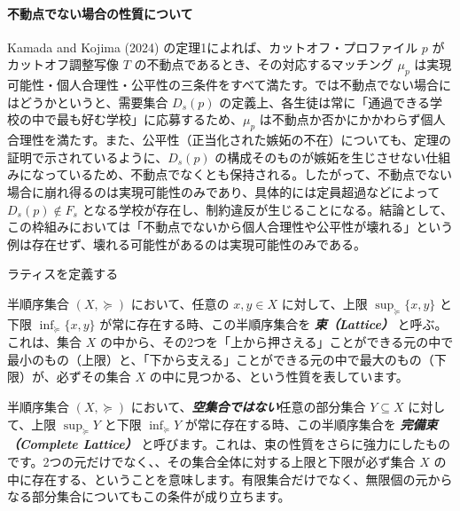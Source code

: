 \documentclass[12pt, a4paper]{article}
\theoremstyle{definition}
\theoremstyle{remark}
\theoremstyle{plain}
\begin{document}
\paragraph{不動点でない場合の性質について}

Kamada and Kojima (2024) の定理1によれば、カットオフ・プロファイル $p$ がカットオフ調整写像 $T$ の不動点であるとき、その対応するマッチング $\mu_p$ は実現可能性・個人合理性・公平性の三条件をすべて満たす。では不動点でない場合にはどうかというと、需要集合 $D_s(p)$ の定義上、各生徒は常に「通過できる学校の中で最も好む学校」に応募するため、$\mu_p$ は不動点か否かにかかわらず個人合理性を満たす。また、公平性（正当化された嫉妬の不在）についても、定理の証明で示されているように、$D_s(p)$ の構成そのものが嫉妬を生じさせない仕組みになっているため、不動点でなくとも保持される。したがって、不動点でない場合に崩れ得るのは実現可能性のみであり、具体的には定員超過などによって $D_s(p)\notin F_s$ となる学校が存在し、制約違反が生じることになる。結論として、この枠組みにおいては「不動点でないから個人合理性や公平性が壊れる」という例は存在せず、壊れる可能性があるのは実現可能性のみである。



ラティスを定義する








半順序集合 $(X, \succeq)$ において、任意の $x, y \in X$ に対して、上限 $\sup_{\succeq} \{x, y\}$ と下限 $\inf_{\succeq} \{x, y\}$ が常に存在する時、この半順序集合を \textbf{\textit{束（Lattice）}} と呼ぶ。これは、集合 $X$ の中から、その2つを「上から押さえる」ことができる元の中で最小のもの（上限）と、「下から支える」ことができる元の中で最大のもの（下限）が、必ずその集合 $X$ の中に見つかる、という性質を表しています。


半順序集合 $(X, \succeq)$ において、\textbf{\textit{空集合ではない}}任意の部分集合 $Y \subseteq X$ に対して、上限 $\sup_{\succeq} Y$ と下限 $\inf_{\succeq} Y$ が常に存在する時、この半順序集合を \textbf{\textit{完備束（Complete Lattice）}} と呼びます。これは、束の性質をさらに強力にしたものです。2つの元だけでなく、、その集合全体に対する上限と下限が必ず集合 $X$ の中に存在する、ということを意味します。有限集合だけでなく、無限個の元からなる部分集合についてもこの条件が成り立ちます。
\end{document}

